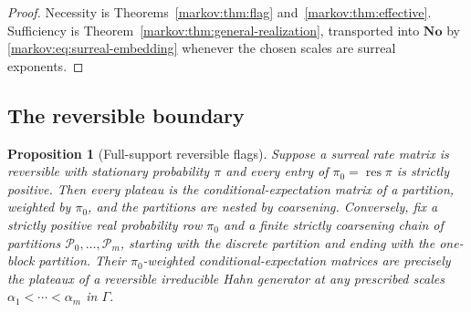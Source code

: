 \documentclass[11pt]{article}
\numberwithin{equation}{section}
\newtheorem{proposition}[theorem]{Proposition}
\theoremstyle{definition}
\theoremstyle{remark}
\newcommand{\No}{\mathbf{No}}
\newcommand{\res}{\operatorname{res}}
\begin{document}
\begin{proof}
Necessity is Theorems~\ref{markov:thm:flag} and~\ref{markov:thm:effective}. Sufficiency is
Theorem~\ref{markov:thm:general-realization}, transported into $\No$ by
\eqref{markov:eq:surreal-embedding} whenever the chosen scales are surreal exponents.
\end{proof}

\subsection{The reversible boundary}

\begin{proposition}[Full-support reversible flags]\label{markov:prop:reversible}
Suppose a surreal rate matrix is reversible with stationary probability $\pi$
and every entry of $\pi_0=\res\pi$ is strictly positive. Then every plateau is
the conditional-expectation matrix of a partition, weighted by $\pi_0$, and the
partitions are nested by coarsening. Conversely, fix a strictly positive real
probability row $\pi_0$ and a finite strictly coarsening chain of partitions
$\mathcal P_0,\ldots,\mathcal P_m$, starting with the discrete partition and
ending with the one-block partition. Their $\pi_0$-weighted
conditional-expectation matrices are precisely the plateaux of a reversible
irreducible Hahn generator at any prescribed scales
$\alpha_1<\cdots<\alpha_m$ in $\Gamma$.
\end{proposition}
\end{document}

